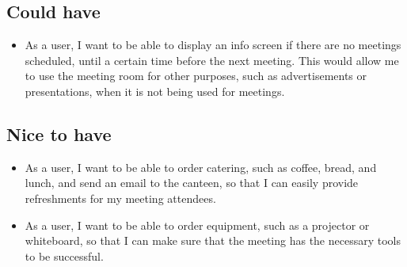 \subsection{Could have}
\begin{itemize}
\item As a user, I want to be able to display an info screen if there are no meetings scheduled, until a certain time before the next meeting. This would allow me to use the meeting room for other purposes, such as advertisements or presentations, when it is not being used for meetings.
\end{itemize}

\subsection{Nice to have}
\begin{itemize}
\item As a user, I want to be able to order catering, such as coffee, bread, and lunch, and send an email to the canteen, so that I can easily provide refreshments for my meeting attendees.
\item As a user, I want to be able to order equipment, such as a projector or whiteboard, so that I can make sure that the meeting has the necessary tools to be successful.
\end{itemize}